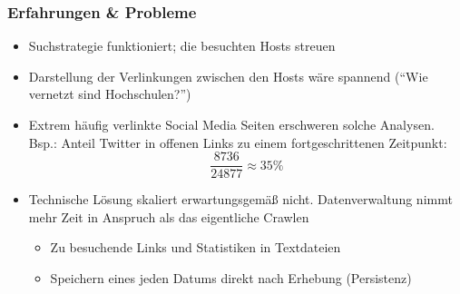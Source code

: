 \documentclass[accentcolor=tud7b,noresetcounter]{tudbeamer}
\begin{document}
  \begin{frame}
  	\frametitle{Erfahrungen \& Probleme}
  	\begin{itemize}
		\item Suchstrategie funktioniert; die besuchten Hosts streuen
		\item Darstellung der Verlinkungen zwischen den Hosts wäre spannend ("`Wie vernetzt sind Hochschulen?"')
		\item Extrem häufig verlinkte Social Media Seiten erschweren solche Analysen. Bsp.: Anteil Twitter in offenen Links zu einem fortgeschrittenen Zeitpunkt: 
			$$\frac{8736}{24877}  \approx  35\%$$
  		\item Technische Lösung skaliert erwartungsgemäß nicht. Datenverwaltung nimmt mehr Zeit in Anspruch als das eigentliche Crawlen
			\begin{itemize}
				\item Zu besuchende Links und Statistiken in Textdateien
				\item Speichern eines jeden Datums direkt nach Erhebung (Persistenz)
			\end{itemize}

  	\end{itemize}

  \end{frame}

  
    

\end{document}
